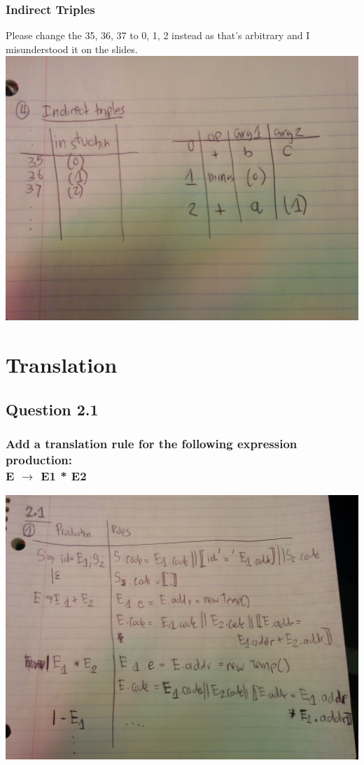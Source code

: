 \documentclass[11pt, oneside]{article}   	%
\begin{document}
\subsubsection{Indirect Triples}
\par Please change the 35, 36, 37 to 0, 1, 2 instead as that's arbitrary and I misunderstood it on the slides. \\
\includegraphics[scale=0.12]{IMG_20141029_001005.jpg}

\newpage

\section{Translation}

\subsection{Question 2.1}

\subsubsection{Add a translation rule for the following expression production: \\ E $\rightarrow$ E1 * E2}
\includegraphics[scale=0.12]{IMG_20141029_003207.jpg}
\end{document}
